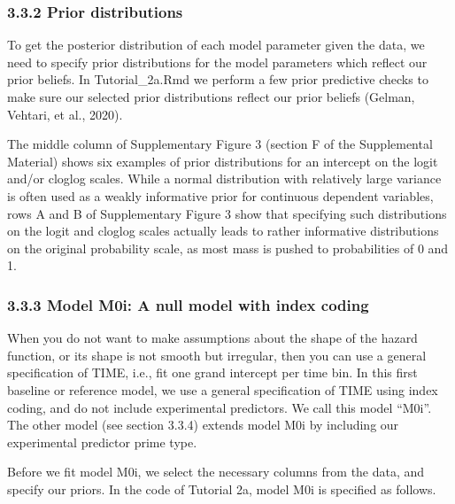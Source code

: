 \documentclass[
  man, donotrepeattitle,floatsintext]{apa6}
\begin{document}
\normalsize

\subsubsection{3.3.2 Prior distributions}\label{prior-distributions}

To get the posterior distribution of each model parameter given the data, we need to specify prior distributions for the model parameters which reflect our prior beliefs.
In Tutorial\_2a.Rmd we perform a few prior predictive checks to make sure our selected prior distributions reflect our prior beliefs (Gelman, Vehtari, et al., 2020).

The middle column of Supplementary Figure 3 (section F of the Supplemental Material) shows six examples of prior distributions for an intercept on the logit and/or cloglog scales. While a normal distribution with relatively large variance is often used as a weakly informative prior for continuous dependent variables, rows A and B of Supplementary Figure 3 show that specifying such distributions on the logit and cloglog scales actually leads to rather informative distributions on the original probability scale, as most mass is pushed to probabilities of 0 and 1.

\subsubsection{3.3.3 Model M0i: A null model with index coding}\label{model-m0i-a-null-model-with-index-coding}

When you do not want to make assumptions about the shape of the hazard function, or its shape is not smooth but irregular, then you can use a general specification of TIME, i.e., fit one grand intercept per time bin. In this first baseline or reference model, we use a general specification of TIME using index coding, and do not include experimental predictors. We call this model ``M0i''. The other model (see section 3.3.4) extends model M0i by including our experimental predictor prime type.

Before we fit model M0i, we select the necessary columns from the data, and specify our priors. In the code of Tutorial 2a, model M0i is specified as follows.
\end{document}
